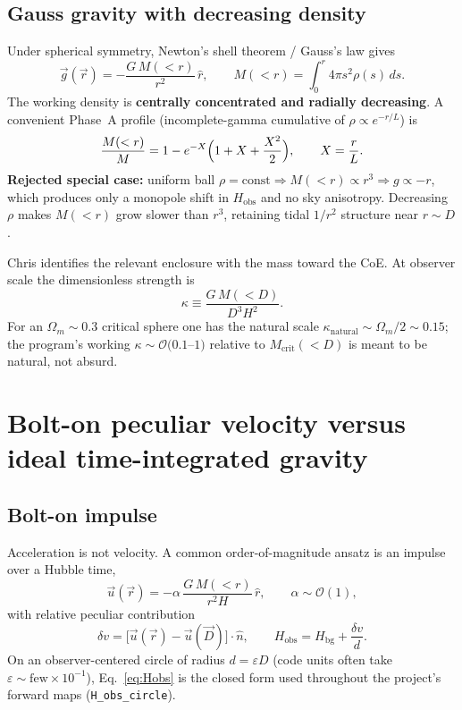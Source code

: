 \documentclass[11pt,a4paper]{article}
\begin{document}
\subsection{Gauss gravity with decreasing density}
\label{sec:gauss}

Under spherical symmetry, Newton's shell theorem / Gauss's law gives
\begin{equation}
\vec{g}(\vec{r})=-\frac{G\,M(<r)}{r^2}\,\hat{r},\qquad
M(<r)=\int_0^r 4\pi s^2\rho(s)\,ds.
\label{eq:gauss}
\end{equation}
The working density is \textbf{centrally concentrated and radially decreasing}.
A convenient Phase~A profile (incomplete-gamma cumulative of
$\rho\propto e^{-r/L}$) is
\begin{equation}
\frac{M(<r)}{M}=1-e^{-X}\Bigl(1+X+\frac{X^2}{2}\Bigr),\qquad X=\frac{r}{L}.
\label{eq:profile}
\end{equation}
\textbf{Rejected special case:} uniform ball $\rho=\mathrm{const}\Rightarrow
M(<r)\propto r^3\Rightarrow g\propto -r$, which produces only a monopole shift
in $H_{\mathrm{obs}}$ and no sky anisotropy. Decreasing $\rho$ makes $M(<r)$
grow slower than $r^3$, retaining tidal $1/r^2$ structure near $r\sim D$.

Chris identifies the relevant enclosure with the mass toward the CoE. At
observer scale the dimensionless strength is
\begin{equation}
\kappa\equiv\frac{G\,M(<D)}{D^3 H^2}.
\label{eq:kappa}
\end{equation}
For an $\Omega_m\sim0.3$ critical sphere one has the natural scale
$\kappa_{\mathrm{natural}}\sim\Omega_m/2\sim0.15$; the program's working
$\kappa\sim\mathcal{O}(0.1$--$1)$ relative to $M_{\mathrm{crit}}(<D)$ is meant
to be natural, not absurd.

\section{Bolt-on peculiar velocity versus ideal time-integrated gravity}
\label{sec:boltideal}

\subsection{Bolt-on impulse}
Acceleration is not velocity. A common order-of-magnitude ansatz is an impulse
over a Hubble time,
\begin{equation}
\vec{u}(\vec{r})=-\alpha\,\frac{G\,M(<r)}{r^2 H}\,\hat{r},\qquad
\alpha\sim\mathcal{O}(1),
\label{eq:bolton}
\end{equation}
with relative peculiar contribution
\begin{equation}
\delta v=\bigl[\vec{u}(\vec{r})-\vec{u}(\vec{D})\bigr]\cdot\hat{n},\qquad
H_{\mathrm{obs}}=H_{\mathrm{bg}}+\frac{\delta v}{d}.
\label{eq:Hobs}
\end{equation}
On an observer-centered circle of radius $d=\varepsilon D$ (code units often
take $\varepsilon\sim\mathrm{few}\times10^{-1}$), Eq.~\eqref{eq:Hobs} is the
closed form used throughout the project's forward maps
(\texttt{H\_obs\_circle}).
\end{document}
